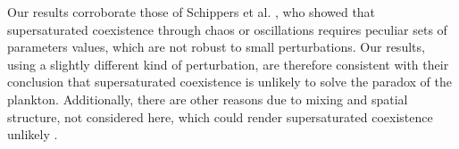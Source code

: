 Our results corroborate those of Schippers et al. \cite{2008:Schippers}, who showed that supersaturated coexistence through chaos or oscillations requires peculiar sets of parameters values, which are not robust to small perturbations. Our results, using a slightly different kind of perturbation, are therefore consistent with their conclusion that supersaturated coexistence is unlikely to solve the paradox of the plankton. Additionally, there are other reasons due to mixing and spatial structure, not considered here, which could render supersaturated coexistence unlikely \cite{roelke2008mixing}. 



